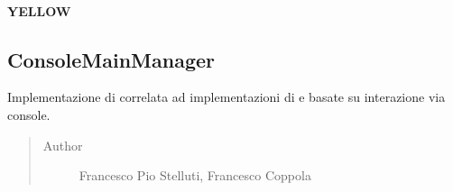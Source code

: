 \documentclass[letterpaper,10pt,italian,openany,oneside]{sphinxmanual}
\begin{document}
\paragraph{YELLOW}
\label{\detokenize{source/it/unicam/cs/pa/mastermind/gamecore/ColorPegs:yellow}}

\begin{fulllineitems}
\label{\detokenize{source/it/unicam/cs/pa/mastermind/gamecore/ColorPegs:it.unicam.cs.pa.mastermind.gamecore.ColorPegs.YELLOW}}
\end{fulllineitems}



\subsection{ConsoleMainManager}
\label{\detokenize{source/it/unicam/cs/pa/mastermind/gamecore/ConsoleMainManager:consolemainmanager}}\label{\detokenize{source/it/unicam/cs/pa/mastermind/gamecore/ConsoleMainManager::doc}}

\begin{fulllineitems}
\label{\detokenize{source/it/unicam/cs/pa/mastermind/gamecore/ConsoleMainManager:it.unicam.cs.pa.mastermind.gamecore.ConsoleMainManager}}
Implementazione di  correlata ad implementazioni di  e  basate su interazione via console.
\begin{quote}\begin{description}
\item[{Author}] \leavevmode
Francesco Pio Stelluti, Francesco Coppola

\end{description}\end{quote}

\end{fulllineitems}
\end{document}
